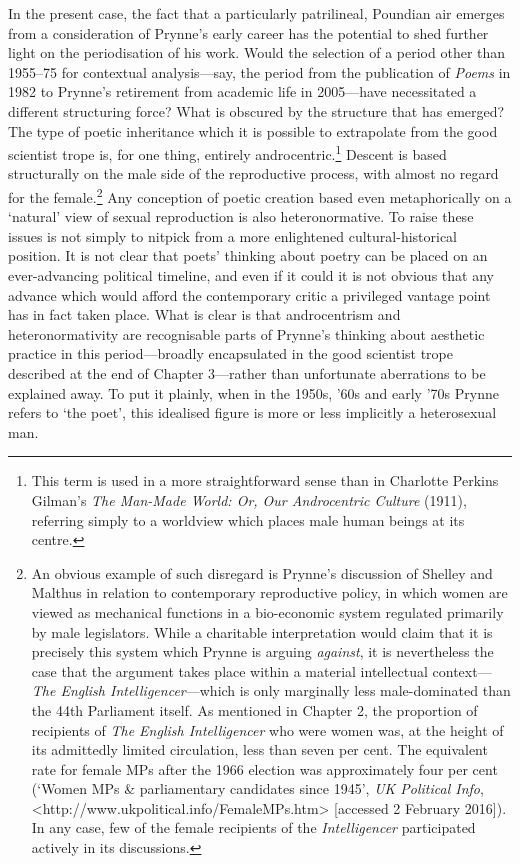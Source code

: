 \documentclass[]{article}
\begin{document}
In the present case, the fact that a particularly patrilineal, Poundian
air emerges from a consideration of Prynne's early career has the
potential to shed further light on the periodisation of his work. Would
the selection of a period other than 1955--75 for contextual
analysis---say, the period from the publication of \emph{Poems} in 1982
to Prynne's retirement from academic life in 2005---have necessitated a
different structuring force? What is obscured by the structure that has
emerged? The type of poetic inheritance which it is possible to
extrapolate from the good scientist trope is, for one thing, entirely
androcentric.\footnote{This term is used in a more straightforward sense
  than in Charlotte Perkins Gilman's \emph{The Man-Made World: Or, Our
  Androcentric Culture} (1911), referring simply to a worldview which
  places male human beings at its centre.} Descent is based structurally
on the male side of the reproductive process, with almost no regard for
the female.\footnote{An obvious example of such disregard is Prynne's
  discussion of Shelley and Malthus in relation to contemporary
  reproductive policy, in which women are viewed as mechanical functions
  in a bio-economic system regulated primarily by male legislators.
  While a charitable interpretation would claim that it is precisely
  this system which Prynne is arguing \emph{against}, it is nevertheless
  the case that the argument takes place within a material intellectual
  context---\emph{The English Intelligencer}---which is only marginally
  less male-dominated than the 44th Parliament itself. As mentioned in
  Chapter 2, the proportion of recipients of \emph{The English
  Intelligencer} who were women was, at the height of its admittedly
  limited circulation, less than seven per cent. The equivalent rate for
  female MPs after the 1966 election was approximately four per cent
  (`Women MPs \& parliamentary candidates since 1945', \emph{UK
  Political Info},
  \textless{}http://www.ukpolitical.info/FemaleMPs.htm\textgreater{}
  {[}accessed 2 February 2016{]}). In any case, few of the female
  recipients of the \emph{Intelligencer} participated actively in its
  discussions.} Any conception of poetic creation based even
metaphorically on a `natural' view of sexual reproduction is also
heteronormative. To raise these issues is not simply to nitpick from a
more enlightened cultural-historical position. It is not clear that
poets' thinking about poetry can be placed on an ever-advancing
political timeline, and even if it could it is not obvious that any
advance which would afford the contemporary critic a privileged vantage
point has in fact taken place. What is clear is that androcentrism and
heteronormativity are recognisable parts of Prynne's thinking about
aesthetic practice in this period---broadly encapsulated in the good
scientist trope described at the end of Chapter 3---rather than
unfortunate aberrations to be explained away. To put it plainly, when in
the 1950s, '60s and early '70s Prynne refers to `the poet', this
idealised figure is more or less implicitly a heterosexual man.
\end{document}
